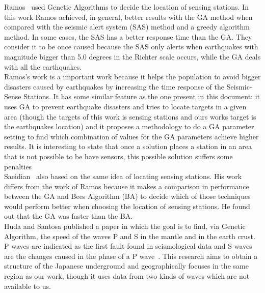 Ramos~\cite{Ramos2011} used Genetic Algorithms to decide the location of sensing stations. In this work Ramos achieved, in general, better results with the GA method when compared with the seismic alert system (SAS) method and a greedy algorithm method. In some cases, the SAS has a better response time than the GA. They consider it to be once caused because the SAS only alerts when earthquakes with magnitude bigger than 5.0 degrees in the Richter scale occurs, while the GA deals with all the earthquakes.\\

Ramos's work is a important work because it helps the population to avoid bigger disasters caused by earthquakes by increasing the time response of the Seismic-Sense Stations. It has some similar feature as the one present in this document: it uses GA to prevent earthquake disasters and tries to locate targets in a given area (though the targets of this work is sensing stations and ours works target is the earthquakes location) and it proposes a methodology to do a GA parameter setting to find which combination of values for the GA parameters achieve higher results. It is interesting to state that once a solution places a station in an area that is not possible to be have sensors, this possible solution suffers some penalties\\

Saeidian~\cite{saeidian2016evaluation} also based on the same idea of locating sensing stations. His work differs from the work of Ramos because it makes a comparison in performance between the GA and Bees Algorithm (BA) to decide which of those techniques would perform better when choosing the location of sensing stations. He found out that the GA was faster than the BA.\\

Huda and Santosa \cite{ijse5762} published a paper in which the goal is to find, via Genetic Algorithm, the speed of the waves P and S in the mantle and in the earth crust. P waves are indicated as the first fault found  in seismological data and S waves are the changes caused in the phase of a P wave~\cite{ijse5762}. This research aims to obtain a structure of the Japanese underground and geographically focuses in the same region as our work, though it uses data from two kinds of waves which are not available to us.\\